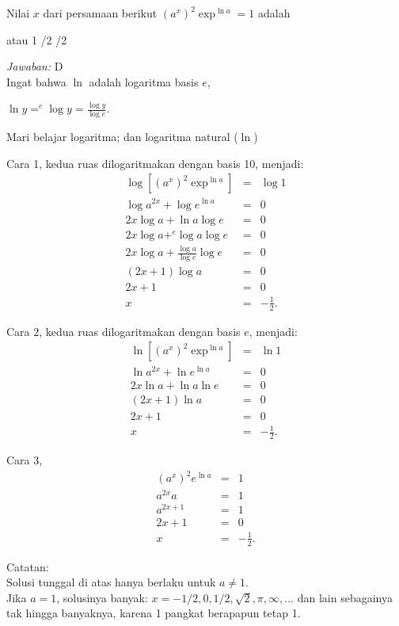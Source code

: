 \documentclass[11pt,fleqn]{exam}
\begin{document}
\begin{questions}
\question Nilai $x$ dari persamaan berikut $(a^x)^2 \exp^{\ln a}=1$ adalah
\begin{choices}
 atau 1
/2
/2
\end{choices}

\textit{Jawaban: }D\\
Ingat bahwa $\ln$ adalah logaritma basis $e$, 

$\ln y = ^e\log y=\frac{\log y}{\log e}$.

Mari belajar logaritma; dan logaritma natural ($\ln$)

Cara 1, kedua ruas dilogaritmakan dengan basis 10, menjadi:
\begin{eqnarray*}
\log [(a^x)^2 \exp^{\ln a}]&=&\log 1\\
\log a^{2x}+\log e^{\ln a}&=&0\\
2x\log a+\ln a \log e&=&0\\
2x\log a+ ^e\log a \log e&=&0\\
2x\log a+\frac{\log a}{\log e} \log e&=&0\\
(2x + 1) \log a  &=&0\\
2x+1&=&0\\
x&=&-\frac{1}{2}.
\end{eqnarray*}

Cara 2, kedua ruas dilogaritmakan dengan basis $e$, menjadi:
\begin{eqnarray*}
\ln [(a^x)^2 \exp^{\ln a}]&=&\ln 1\\
\ln a^{2x}+\ln e^{\ln a}&=&0\\
2x\ln a+\ln a \ln e&=&0\\
(2x + 1) \ln a &=&0\\
2x+1&=&0\\
x&=&-\frac{1}{2}.
\end{eqnarray*}

Cara 3,
\begin{eqnarray*}
	(a^x)^2 e^{\ln a}&=& 1\\
	a^{2x} a &=& 1\\
	a^{2x + 1} &=& 1\\
	2x+1&=&0\\
	x&=&-\frac{1}{2}.
\end{eqnarray*}

Catatan: \\
Solusi tunggal di atas hanya berlaku untuk $a \neq 1$. \\
Jika $a = 1$, solusinya banyak: $x = -1/2, 0, 1/2, \sqrt{2}, \pi, \infty, \ldots$ dan lain sebagainya tak hingga banyaknya, karena 1 pangkat berapapun tetap 1. 


\end{questions}
\end{document}
